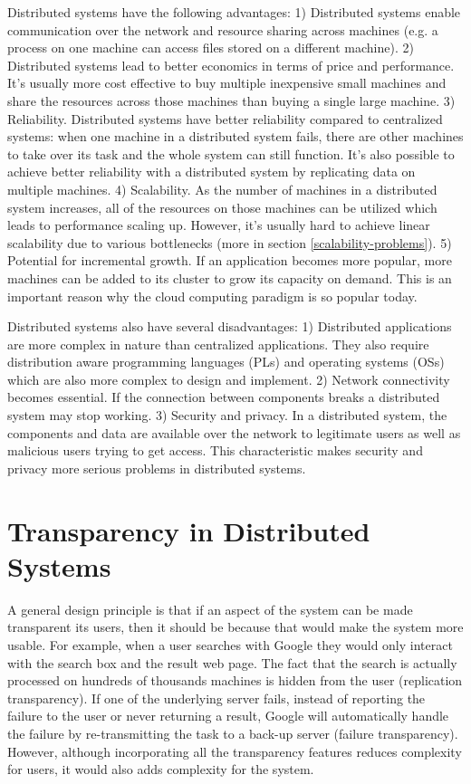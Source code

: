 \documentclass[twoside]{article}
\begin{document}
Distributed systems have the following advantages:
1) Distributed systems enable communication over the network and resource sharing across machines (e.g. a process on one machine can access files stored on a different machine).
2) Distributed systems lead to better economics in terms of price and performance. It's usually more cost effective to buy multiple inexpensive small machines and share the resources across those machines than buying a single large machine.
3) Reliability. Distributed systems have better reliability compared to centralized systems: when one machine in a distributed system fails, there are other machines to take over its task and the whole system can still function. It's also possible to achieve better reliability with a distributed system by replicating data on multiple machines.
4) Scalability. As the number of machines in a distributed system increases, all of the resources on those machines can be utilized which leads to performance scaling up. However, it's usually hard to achieve linear scalability due to various bottlenecks (more in section \ref{scalability-problems}).
5) Potential for incremental growth. If an application becomes more popular, more machines can be added to its cluster to grow its capacity on demand. This is an important reason why the cloud computing paradigm is so popular today.

Distributed systems also have several disadvantages:
1) Distributed applications are more complex in nature than centralized applications. They also require distribution aware programming languages (PLs) and operating systems (OSs) which are also more complex to design and implement.
2) Network connectivity becomes essential. If the connection between components breaks a distributed system may stop working.
3) Security and privacy. In a distributed system, the components and data are available over the network to legitimate users as well as malicious users trying to get access. This characteristic makes security and privacy more serious problems in distributed systems.

\section{Transparency in Distributed Systems}

A general design principle is that if an aspect of the system can be made transparent its users, then it should be because that would make the system more usable. For example, when a user searches with Google they would only interact with the search box and the result web page. The fact that the search is actually processed on hundreds of thousands machines is hidden from the user (replication transparency). If one of the underlying server fails, instead of reporting the failure to the user or never returning a result, Google will automatically handle the failure by re-transmitting the task to a back-up server (failure transparency). However, although incorporating all the transparency features reduces complexity for users, it would also adds complexity for the system. 
\end{document}
